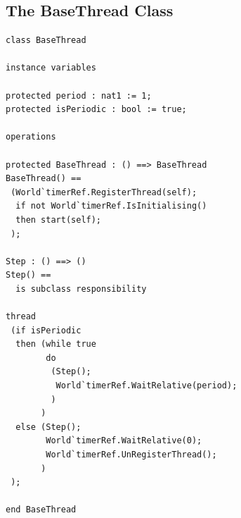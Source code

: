 \documentclass{overturerepchap}
\begin{document}
\subsection{The BaseThread Class}

\begin{lstlisting}
class BaseThread
	
instance variables

protected period : nat1 := 1;
protected isPeriodic : bool := true;

operations

protected BaseThread : () ==> BaseThread
BaseThread() ==
 (World`timerRef.RegisterThread(self);
  if not World`timerRef.IsInitialising()
  then start(self);  
 );

Step : () ==> ()
Step() ==
  is subclass responsibility

thread
 (if isPeriodic
  then (while true
        do 
         (Step();
          World`timerRef.WaitRelative(period);
         )
       )
  else (Step();
        World`timerRef.WaitRelative(0);
        World`timerRef.UnRegisterThread();
       )
 );

end BaseThread
\end{lstlisting}
\end{document}
